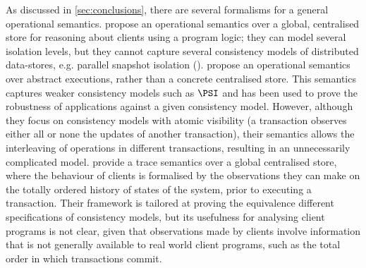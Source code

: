 As discussed in \cref{sec:conclusions}, there are several formalisms for a general operational semantics.
\cite{alonetogether} propose an operational
semantics over a global, centralised store for reasoning about clients using a program logic; 
they can model several isolation levels, but they cannot
capture several consistency models of distributed data-stores, e.g.  
parallel snapshot isolation (\PSI). 
\cite{sureshConcur} propose an operational semantics over abstract executions, 
rather than a concrete centralised store. This semantics captures weaker consistency models
such as \(\PSI\) and has been used to prove the robustness of applications against
a given consistency model. However, although they focus on consistency models with atomic 
visibility (a transaction observes either all or none the updates of another transaction), 
their semantics allows the interleaving of operations in different transactions, resulting in an unnecessarily complicated model.
\cite{seebelieve} provide a trace semantics over a global
centralised store, where the behaviour of clients is formalised by the   
observations they can make on the totally ordered history of states of the system, prior to executing a transaction. 
Their framework is tailored at proving the equivalence different specifications of consistency models, 
but its usefulness  for analysing client programs is not clear, 
 given that observations made by clients involve information that is not generally 
available to real world client programs, such as the total order in which transactions commit.

